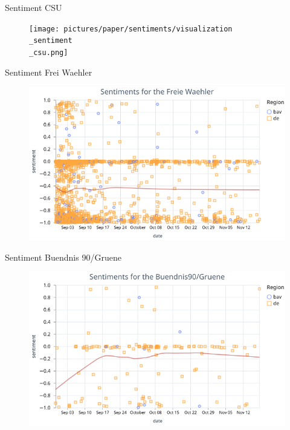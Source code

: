 \begin{frame}{Sentiment CSU}
	\begin{figure}[htbp]
		\centering
		\texttt{[image: pictures/paper/sentiments/visualization\\\_sentiment\\\_csu.png]}
	\end{figure}
\end{frame}


\begin{frame}{Sentiment Frei Waehler}
	\begin{figure}[htbp]
		\centering
		\includegraphics[height=0.9\textheight, keepaspectratio]{pictures/paper/sentiments/visualization_sentiment_fw.png}
	\end{figure}
\end{frame}


\begin{frame}{Sentiment Buendnis 90/Gruene}
	\begin{figure}[htbp]
		\centering
		\includegraphics[height=0.9\textheight, keepaspectratio]{pictures/paper/sentiments/visualization_sentiment_gruene.png}
	\end{figure}
\end{frame}
